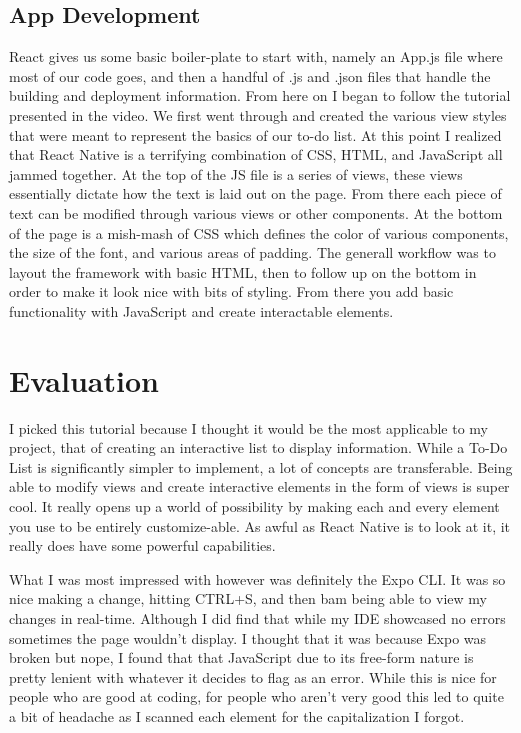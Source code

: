 \documentclass[10pt,twocolumn]{article}
\begin{document}
\subsection{App Development}
React gives us some basic boiler-plate to start with, namely an App.js file where most of our code goes, and then a handful of .js and .json files that handle the building and deployment information.
From here on I began to follow the tutorial presented in the video.
We first went through and created the various view styles that were meant to represent the basics of our to-do list. At this point I realized that React Native is a terrifying combination of CSS, HTML, and JavaScript all jammed together. At the top of the JS file is a series of views, these views essentially dictate how the text is laid out on the page. From there each piece of text can be modified through various views or other components. At the bottom of the page is a mish-mash of CSS which defines the color of various components, the size of the font, and various areas of padding. The generall workflow was to layout the framework with basic HTML, then to follow up on the bottom in order to make it look nice with bits of styling. From there you add basic functionality with JavaScript and create interactable elements. 

\section{Evaluation}

I picked this tutorial because I thought it would be the most applicable to my project, that of creating an interactive list to display information. While a To-Do List is significantly simpler to implement, a lot of concepts are transferable. Being able to modify views and create interactive elements in the form of views is super cool. It really opens up a world of possibility by making each and every element you use to be entirely customize-able. As awful as React Native is to look at it, it really does have some powerful capabilities. 

What I was most impressed with however was definitely the Expo CLI. It was so nice making a change, hitting CTRL+S, and then bam being able to view my changes in real-time. Although I did find that while my IDE showcased no errors sometimes the page wouldn’t display. I thought that it was because Expo was broken but nope, I found that that JavaScript due to its free-form nature is pretty lenient with whatever it decides to flag as an error. While this is nice for people who are good at coding, for people who aren’t very good this led to quite a bit of headache as I scanned each element for the capitalization I forgot. 
\end{document}
